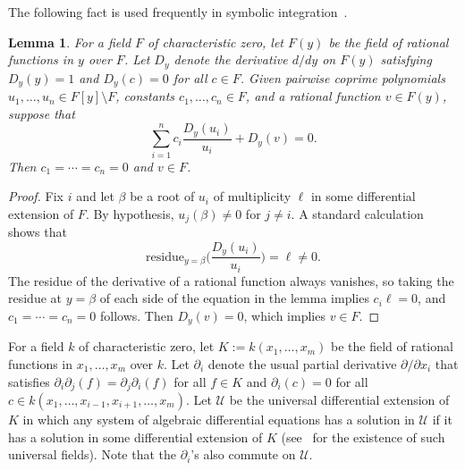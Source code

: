 \documentclass{amsart}
\newtheorem{lem}[thm]{Lemma}
\theoremstyle{definition}
\numberwithin{equation}{section}
\numberwithin{thm}{section}
\begin{document}
The following fact is used frequently in symbolic integration~\cite{Bronstein}.

\begin{lem}
\label{LEM:fact}
For a field $F$ of characteristic zero, let $F(y)$ be the field of rational functions in $y$ over $F$. Let $D_y$ denote the derivative $d/dy$ on $F(y)$ satisfying $D_y(y) = 1$ and $D_y(c)=0$ for all $c\in F$.  Given pairwise coprime polynomials $u_1, \ldots, u_n\in F[y]\setminus F$, constants $c_1, \ldots, c_n\in F$, and a rational function $v\in F(y)$, suppose that
\[
\sum_{i=1}^n c_i \frac{D_y(u_i)}{u_i} + D_y(v) = 0.
\]
Then $c_1 = \cdots = c_n = 0$ and $v\in F$.
\end{lem}

\begin{proof}
Fix $i$ and let $\beta$ be a root of $u_i$ of multiplicity $\ell$ in some differential extension of $F$.   By hypothesis, $u_j(\beta) \ne 0$ for $j \ne i$.  A standard calculation shows that
\[ \text{residue}_{y=\beta}\Big( \frac{D_y(u_i)}{u_i}\Big) = \ell \ne 0.\]
The residue of the derivative of a rational function always vanishes, so taking the residue at $y=\beta$ of each side of the equation in the lemma implies $c_i \ell = 0$, and $c_1 = \cdots = c_n = 0$ follows.  Then $D_y(v) = 0$, which implies $v \in F$.
\end{proof}

For a field $k$ of characteristic zero, let $K:=k(x_1, \ldots, x_m)$ be the field of rational functions in $x_1, \ldots, x_m$ over $k$.  Let $\partial_i$ denote the usual partial derivative $\partial/\partial x_i$ that satisfies $\partial_i \partial_j(f) = \partial_j\partial_i(f)$ for all $f\in K$ and $\partial_{i}(c)=0$ for all $c \in k(x_1, \ldots, x_{i-1}, x_{i+1}, \ldots, x_m)$.
Let $\mathcal{U}$ be the universal differential extension of $K$ in which any system of
algebraic differential equations has a solution in $\mathcal{U}$ if it has a solution in some differential extension of $K$ (see~\cite[Ch.~III, Section 7]{kolchin} for the existence of such universal fields). Note that the $\partial_i$'s also commute on $\mathcal{U}$.
\end{document}
